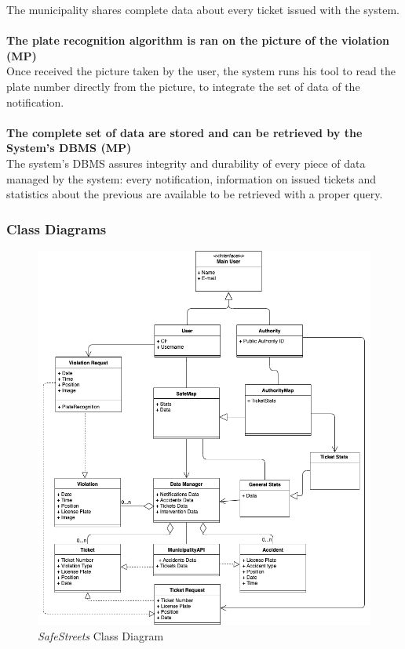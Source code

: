 \documentclass {article}
\begin{document}
		The municipality shares complete data about every ticket issued with the system.\\ \\
	{\bf The plate recognition algorithm is ran on the picture of the violation (MP)}\\
		Once received the picture taken by the user, the system runs his tool to read the plate number directly from the picture, to integrate the set of data of the notification.\\ \\
	{\bf The complete set of data are stored and can be retrieved by the System's DBMS (MP)}\\
		The system’s DBMS assures integrity and durability of every piece of data managed by the system: every notification, information on issued tickets and statistics about the previous are available to be retrieved with a proper query.\\
		
		
	\subsubsection{Class Diagrams}	
	\begin{figure}[H]
				\centering
				\includegraphics[scale=0.5]{Images/Diagrams/Class_Diagram.png}
				\caption{{\it SafeStreets} Class Diagram}
	\end{figure}
	
\end{document}
